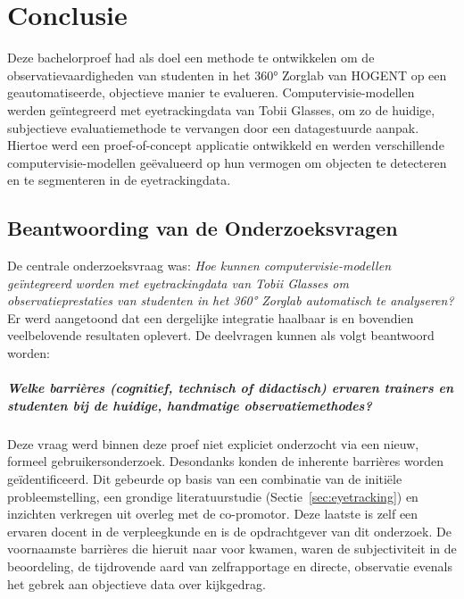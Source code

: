 
\chapter{Conclusie}%
\label{ch:conclusie}

Deze bachelorproef had als doel een methode te ontwikkelen om de observatievaardigheden van 
studenten in het 360° Zorglab van HOGENT op een geautomatiseerde, objectieve manier te evalueren.
Computervisie-modellen werden geïntegreerd met eyetrackingdata van Tobii Glasses, om zo de huidige, 
subjectieve evaluatiemethode te vervangen door een datagestuurde aanpak.
Hiertoe werd een proef-of-concept applicatie ontwikkeld en werden verschillende computervisie-modellen 
geëvalueerd op hun vermogen om objecten te detecteren en te segmenteren in de eyetrackingdata.

\section{Beantwoording van de Onderzoeksvragen}

De centrale onderzoeksvraag was: 
\textit{Hoe kunnen computervisie-modellen geïntegreerd worden met eyetrackingdata van Tobii Glasses om observatieprestaties 
van studenten in het 360° Zorglab automatisch te analyseren?}
Er werd aangetoond dat een dergelijke integratie haalbaar is en bovendien veelbelovende resultaten oplevert.
De deelvragen kunnen als volgt beantwoord worden:

\paragraph{\textit{Welke barrières (cognitief, technisch of didactisch) ervaren trainers en studenten bij de huidige, handmatige observatiemethodes?}}
Deze vraag werd binnen deze proef niet expliciet onderzocht via een nieuw, formeel gebruikersonderzoek. 
Desondanks konden de inherente barrières worden geïdentificeerd. 
Dit gebeurde op basis van een combinatie van de initiële probleemstelling, een grondige literatuurstudie (Sectie~\ref{sec:eyetracking}) en inzichten verkregen uit overleg met de co-promotor. 
Deze laatste is zelf een ervaren docent in de verpleegkunde en is de opdrachtgever van dit onderzoek. 
De voornaamste barrières die hieruit naar voor kwamen, waren de subjectiviteit in de beoordeling, 
de tijdrovende aard van zelfrapportage en directe, observatie evenals het gebrek aan objectieve data over kijkgedrag.  
    

